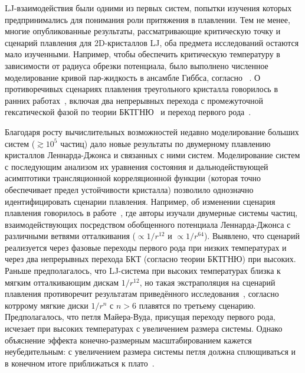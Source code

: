 LJ-взаимодействия были одними из первых систем, попытки изучения которых предпринимались для понимания роли притяжения в плавлении. 
Тем не менее, многие опубликованные результаты, рассматривающие критическую точку и сценарий плавления для 2D-кристаллов LJ, оба предмета исследований остаются мало изученными. 
Например, чтобы обеспечить критическую температуру в зависимости от радиуса обрезки потенциала, было выполнено численное моделирование кривой пар-жидкость в ансамбле Гиббса, согласно ~\cite{10.1063/1.460477}.
О противоречивых сценариях плавления треугольного кристалла говорилось в ранних работах~\cite{10.1103/physrevlett.42.1632, 10.1063/1.436526, 10.1103/physrevlett.44.463, 10.1063/1.441901, 10.1103/physrevlett.52.449, 10.1103/physrevb.30.2755}, включая два непрерывных перехода с промежуточной гексатической фазой по теории БКТГНЮ~\cite{10.1103/physrevlett.42.1632} и переход первого рода~\cite{10.1063/1.436526, 10.1103/physrevlett.44.463, 10.1063/1.441901, 10.1103/physrevlett.52.449}.

Благодаря росту вычислительных возможностей недавно моделирование больших систем ($\gtrsim 10^5$ частиц) дало новые результаты по двумерному плавлению кристаллов Леннарда-Джонса и связанных с ними систем. 
Моделирование систем с последующим анализом их уравнения состояния и дальнодействующей асимптотики трансляционной корреляционной функции (которая точно обеспечивает предел устойчивости кристалла) позволило однозначно идентифицировать сценарии плавления. 
Например, об изменении сценария плавления говорилось в работе~\cite{10.1103/physreve.99.022145}, где авторы изучали двумерные системы частиц, взаимодействующих посредством обобщенного потенциала Леннарда-Джонса с различными ветвями отталкивания ($\propto 1/r ^{12}$ и $\propto 1/r^{64}$).
Выявлено, что сценарий реализуется через фазовые переходы первого рода при низких температурах и через два непрерывных перехода БКТ (согласно теории БКТГНЮ) при высоких. 
Раньше предполагалось, что LJ-система при высоких температурах близка к мягким отталкивающим дискам $1/r^{12}$, но такая экстраполяция на сценарий плавления противоречит результатам приведённого исследования~\cite{10.1103/physrevlett.114.035702}, согласно котррому мягкие диски $1/r^n$ с $n>6$ плавятся по третьему сценарию. 
Предполагалось, что петля Майера-Вуда, присущая переходу первого рода, исчезает при высоких температурах с увеличением размера системы. 
Однако объяснение эффекта конечно-размерным масштабированием кажется неубедительным: с увеличением размера системы петля должна сплющиваться и в конечном итоге приближаться к плато~\cite{10.1103/physreve.87.042134, 10.1103/physreve.59.2659}.

